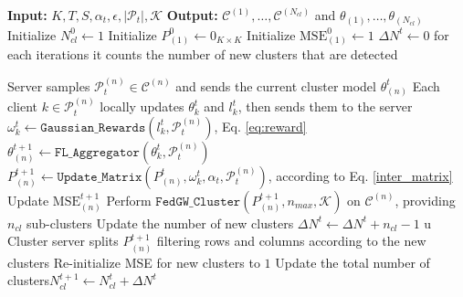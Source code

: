     
\begin{algorithm}[t]
  \caption{\shortname}\label{alg:fedgw_recursion}
  \begin{algorithmic}[1]
    \STATE \textbf{Input:} $K, T, S, \alpha_t, \epsilon, |\mathcal{P}_t|, \mathcal{K}$
    \STATE \textbf{Output:} $\mathcal{C}^{(1)},\dots, \mathcal{C}^{(N_{cl})}$ and $\theta_{(1)}, \dots, \theta_{(N_{cl})}$ 
    \STATE Initialize $N_{cl}^0\gets 1$
    \vspace{.1cm}
    \STATE Initialize $P^{0}_{(1)} \gets 0_{K\times K}$
    \STATE Initialize $\textrm{MSE}^{0}_{(1)} \gets 1$
    \vspace{.1cm}
    \STATE $\Delta N^t \gets 0$ for each iterations it counts the number of new clusters that are detected
    \vspace{.1cm}
    
    \STATE Server samples $\mathcal{P}_t^{(n)} \in \mathcal{C}^{(n)}$ and sends the current cluster model $\theta_{(n)}^t$
    \STATE Each client $k \in \mathcal{P}_t^{(n)}$ locally updates $\theta_k^t$ and $l_k^t$, then sends them to the server
    \STATE $\omega_k^t \gets \texttt{Gaussian\_Rewards}(l_k^t, \mathcal{P}_t^{(n)})$, Eq. \ref{eq:reward}
    \STATE $\theta_{(n)}^{t+1}\gets \texttt{FL\_Aggregator}(\theta_k^t, \mathcal{P}_t^{(n)})$
    \STATE $P^{t+1}_{(n)}\gets\texttt{Update\_Matrix}(P^t_{(n)}, \omega_k^t, \alpha_t, \mathcal{P}_t^{(n)})$, according to Eq. \ref{inter_matrix}
    \vspace{.1cm}
    \STATE Update $\textrm{MSE}_{(n)}^{t+1}$
    \vspace{.1cm}
    \vspace{.1cm}
    \STATE Perform $\texttt{FedGW\_Cluster}(P_{(n)}^{t+1}, n_{max}, \mathcal{K})$ on $\mathcal{C}^{(n)}$, providing $n_{cl}$ sub-clusters
    \vspace{.1cm}
    \STATE Update the number of new clusters $\Delta N^t \gets \Delta N^t + n_{cl} -1 $ u
    \vspace{.1cm}
    \STATE Cluster server splits $P_{(n)}^{t+1}$ filtering rows and columns according to the new clusters
    \vspace{.1cm}
    \STATE Re-initialize MSE for new clusters to $1$
    \vspace{.1cm}
    \ENDIF
    \ENDFOR
    \STATE Update the total number of clusters$N_{cl}^{t+1} \gets N_{cl}^t + \Delta N^t$ 
    \ENDFOR
  \end{algorithmic}
\end{algorithm}
\newpage
